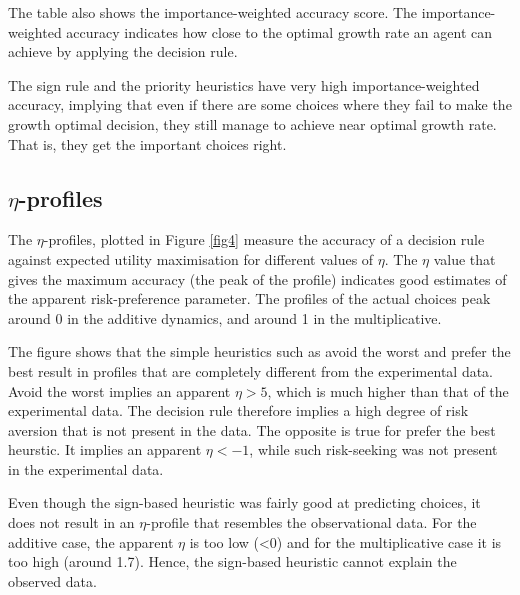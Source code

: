 The table also shows the importance-weighted accuracy score.
The importance-weighted accuracy indicates how close to the optimal growth rate an agent can achieve by applying the decision rule.

The sign rule and the priority heuristics have very high importance-weighted accuracy, implying that even if there are some choices where they fail to make the growth optimal decision, they still manage to achieve near optimal growth rate.
That is, they get the important choices right.

\begin{table}[htbp]
    \centering
    \caption{Mean accuracy and range for each FFT.
    ACC: Accuracy (average match rate) between GR and choices.
    WACC: Importance-weighted accuracy between GR and choices.
    CACC: Accuracy between experimental choices and decision rules. }
    \label{tab:accuracy}
    
\end{table}

\subsection{$\eta$-profiles}
The $\eta$-profiles, plotted in Figure \ref{fig4} measure the accuracy of a decision rule against expected utility maximisation for different values of $\eta$. 
The $\eta$ value that gives the maximum accuracy (the peak of the profile) indicates good estimates of the apparent risk-preference parameter.
The profiles of the actual choices peak around 0 in the additive dynamics, and around 1 in the multiplicative.

The figure shows that the simple heuristics such as avoid the worst and prefer the best result in profiles that are completely different from the experimental data.
Avoid the worst implies an apparent $\eta >5$, which is much higher than that of the experimental data. 
The decision rule therefore implies a high degree of risk aversion that is not present in the data.
The opposite is true for prefer the best heurstic.
It implies an apparent $\eta<-1$, while such risk-seeking was not present in the experimental data.

Even though the sign-based heuristic was fairly good at predicting choices, it does not result in an $\eta$-profile that resembles the observational data.
For the additive case, the apparent $\eta$ is too low  (<0) and for the multiplicative case it is too high (around 1.7). 
Hence, the sign-based heuristic cannot explain the observed data.

